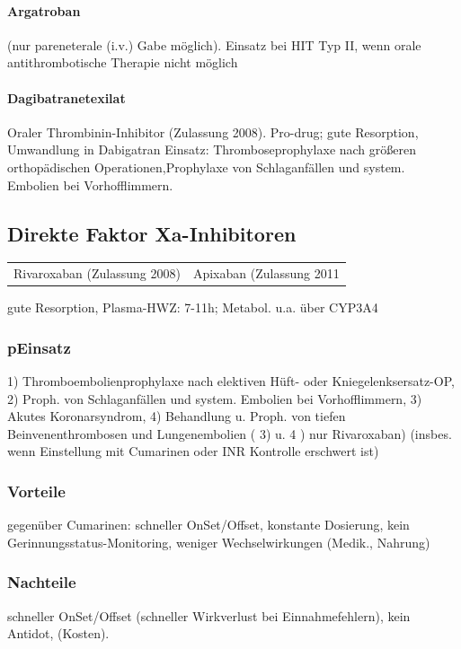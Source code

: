 \documentclass[10pt,a4paper]{report}
\begin{document}
\paragraph{Argatroban} %
\label{subp:argatroban}
(nur pareneterale (i.v.) Gabe möglich). Einsatz bei HIT Typ II, wenn orale antithrombotische Therapie nicht möglich
\paragraph{Dagibatranetexilat} %
\label{subp:dagibatranetexilat}
Oraler Thrombinin-Inhibitor (Zulassung 2008). Pro-drug; gute Resorption, Umwandlung in Dabigatran Einsatz:  Thromboseprophylaxe nach größeren orthopädischen Operationen,Prophylaxe von Schlaganfällen und system. Embolien bei Vorhofflimmern.
\subsection{Direkte Faktor Xa-Inhibitoren} %
\label{ssub:direkte_faktor_xa_inhib}
\begin{tabularx}{\textwidth}{XX}
Rivaroxaban (Zulassung 2008)&Apixaban (Zulassung 2011\\
\end{tabularx}
gute Resorption, Plasma-HWZ: 7-11h; Metabol. u.a. über CYP3A4
\subsubsection{pEinsatz} %
\label{par:paragraph_name}
1) Thromboembolienprophylaxe nach elektiven Hüft- oder Kniegelenksersatz-OP,  2) Proph. von Schlaganfällen und system. Embolien bei Vorhofflimmern, 3) Akutes Koronarsyndrom, 4) Behandlung u. Proph. von tiefen Beinvenenthrombosen und Lungenembolien (  3) u. 4 ) nur Rivaroxaban) (insbes. wenn Einstellung mit Cumarinen oder INR Kontrolle erschwert ist)
\subsubsection{Vorteile} %
\label{par:vorteile}
gegenüber Cumarinen: schneller OnSet/Offset, konstante Dosierung, kein Gerinnungsstatus-Monitoring, weniger Wechselwirkungen (Medik., Nahrung)
\subsubsection{Nachteile} %
\label{par:nachteile}
schneller OnSet/Offset (schneller Wirkverlust bei Einnahmefehlern), kein Antidot, (Kosten).
\end{document}
